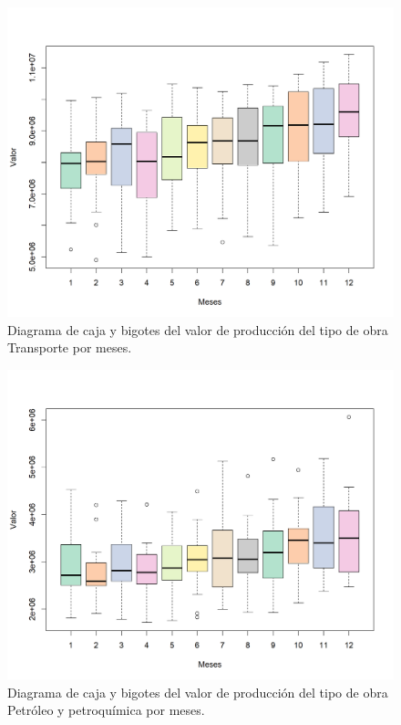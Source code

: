 \documentclass{article}
\begin{document}
\begin{center}
\begin{figure}[H]
\includegraphics[scale=0.8]{boxplot4.png}
\caption{Diagrama de caja y bigotes del valor de producción del tipo de obra Transporte por meses.}
\label{fig:fig4}
\end{figure}
\end{center}

\begin{center}
\begin{figure}[H]
\includegraphics[scale=0.8]{boxplot5.png}
\caption{Diagrama de caja y bigotes del valor de producción del tipo de obra Petróleo y petroquímica por meses.}
\label{fig:fig5}
\end{figure}
\end{center}
\end{document}
